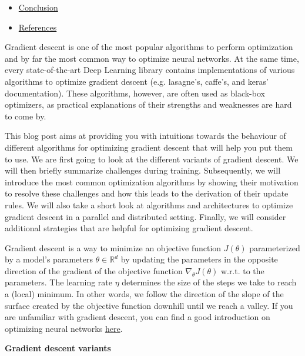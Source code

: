 \documentclass[4pt,journal,compsoc]{IEEEtran}
\begin{document}
\begin{flushleft}
\begin{itemize}
        \item \underline{Conclusion}
        
        \item \underline{References}
    \end{itemize}
    
    Gradient descent is one of the most popular algorithms to perform optimization and by far the most common way to optimize neural networks. At the same time, every state-of-the-art Deep Learning library contains implementations of various algorithms to optimize gradient descent (e.g. lasagne's, caffe's, and keras' documentation). These algorithms, however, are often used as black-box optimizers, as practical explanations of their strengths and weaknesses are hard to come by. \newline

    This blog post aims at providing you with intuitions towards the behaviour of different algorithms for optimizing gradient descent that will help you put them to use. We are first going to look at the different variants of gradient descent. We will then briefly summarize challenges during training. Subsequently, we will introduce the most common optimization algorithms by showing their motivation to resolve these challenges and how this leads to the derivation of their update rules. We will also take a short look at algorithms and architectures to optimize gradient descent in a parallel and distributed setting. Finally, we will consider additional strategies that are helpful for optimizing gradient descent. \newline

    Gradient descent is a way to minimize an objective function $J(\theta)$ parameterized by a model's parameters $\theta \in \mathbb{R} ^ d$ by updating the parameters in the opposite direction of the gradient of the objective function $\nabla _ \theta J(\theta)$ w.r.t. to the parameters. The learning rate $\eta$ determines the size of the steps we take to reach a (local) minimum. In other words, we follow the direction of the slope of the surface created by the objective function downhill until we reach a valley. If you are unfamiliar with gradient descent, you can find a good introduction on optimizing neural networks \underline{here}. \newline \newline
    
    \textbf{\Large Gradient descent variants} \newline
    

\end{flushleft}
\end{document}
